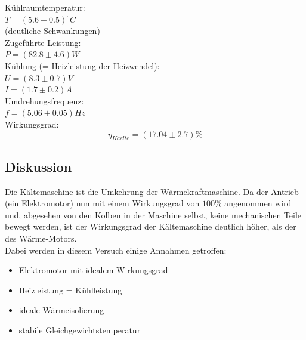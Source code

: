 \documentclass[12pt,a4paper]{article}
\begin{document}
\begin{multicols}{2}
Kühlraumtemperatur:\\ 
$T= (5.6 \pm 0.5)^{\circ}C$\\
\indent (deutliche Schwankungen)\\
Zugeführte Leistung:\\
$P=(82.8 \pm 4.6)W$\\
\noindent Kühlung (= Heizleistung der Heizwendel):\\ 
$U= (8.3 \pm 0.7)V$\\
$I = (1.7 \pm 0.2)A$\\
\noindent Umdrehungsfrequenz:\\
$f = (5.06\pm 0.05)Hz$\\
Wirkungsgrad:\\
$$\eta_{Kaelte}=(17.04\pm 2.7)\%$$

\subsection{Diskussion}

Die Kältemaschine ist die Umkehrung der Wärmekraftmaschine. Da der Antrieb (ein Elektromotor) nun mit einem Wirkungsgrad von $100\%$ angenommen wird und, abgesehen von den Kolben in der Maschine selbst, keine mechanischen Teile bewegt werden, ist der Wirkungsgrad der Kältemaschine deutlich höher, als der des Wärme-Motors.\\
Dabei werden in diesem Versuch einige Annahmen getroffen:\\
\begin{itemize}
\item Elektromotor mit idealem Wirkungsgrad
\item Heizleistung = Kühlleistung
\item ideale Wärmeisolierung
\item stabile Gleichgewichtstemperatur
\end{itemize}


\end{multicols}
\end{document}

